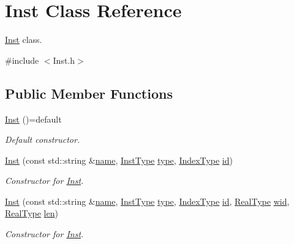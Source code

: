 \hypertarget{classInst}{}\section{Inst Class Reference}
\label{classInst}


\hyperlink{classInst}{Inst} class.  




{\ttfamily \#include $<$Inst.\+h$>$}

\subsection*{Public Member Functions}
\begin{DoxyCompactItemize}
\item 
\hyperlink{classInst_af6abd595ee04b976a8928325df4076c1}{Inst} ()=default
\begin{DoxyCompactList}\small\item\em Default constructor. \end{DoxyCompactList}\item 
\hyperlink{classInst_a30315ac6216ae022a383d701d42e6a86}{Inst} (const std\+::string \&\hyperlink{classInst_af2eca464fb81066a6f9878ae24a8292a}{name}, \hyperlink{type_8h_a53644c687d6bc203d9d3d3ee70075f61}{Inst\+Type} \hyperlink{classInst_a7d6e3dafcbb552bf31069d80b9b87607}{type}, \hyperlink{type_8h_a581e8093e28e7362f2b6937296190676}{Index\+Type} \hyperlink{classInst_a42b641ca923af69de223b8911cc2d45f}{id})
\begin{DoxyCompactList}\small\item\em Constructor for \hyperlink{classInst}{Inst}. \end{DoxyCompactList}\item 
\hyperlink{classInst_adb54d3441f94302e5d0c8e0d8c3ad429}{Inst} (const std\+::string \&\hyperlink{classInst_af2eca464fb81066a6f9878ae24a8292a}{name}, \hyperlink{type_8h_a53644c687d6bc203d9d3d3ee70075f61}{Inst\+Type} \hyperlink{classInst_a7d6e3dafcbb552bf31069d80b9b87607}{type}, \hyperlink{type_8h_a581e8093e28e7362f2b6937296190676}{Index\+Type} \hyperlink{classInst_a42b641ca923af69de223b8911cc2d45f}{id}, \hyperlink{type_8h_a51898ad9e46b1265f3fab67f7d4b04a2}{Real\+Type} \hyperlink{classInst_a18cd79f2cb3e30b1d8731381d311a919}{wid}, \hyperlink{type_8h_a51898ad9e46b1265f3fab67f7d4b04a2}{Real\+Type} \hyperlink{classInst_ab90470caf2f50b7127ee6946d93d449e}{len})
\begin{DoxyCompactList}\small\item\em Constructor for \hyperlink{classInst}{Inst}. \end{DoxyCompactList}\item 

\end{DoxyCompactItemize}

